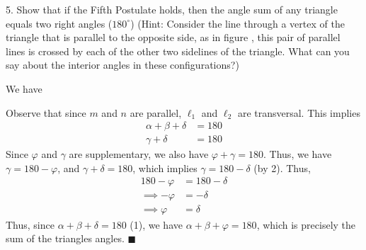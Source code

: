 \documentclass{report}
\begin{document}
    \pagebreak \bigbreak \noindent 
    \begin{mdframed}
        5. Show that if the Fifth Postulate holds, then the angle sum of any triangle equals two right angles ($180^{\circ}$) (Hint: Consider the line through a vertex of the triangle that is parallel to the opposite side, as in figure \thefigtitle, this pair of parallel lines is crossed by each of the other two sidelines of the triangle. What can you say about the interior angles in these configurations?)
    \end{mdframed}
    \bigbreak \noindent 
    \begin{figure}[ht]
        \centering
        \label{fig:fig5}
    \end{figure}
    \fc{}
    \bigbreak \noindent 
    We have
    \bigbreak \noindent 
\begin{figure}[ht]
    \centering
    \label{fig:lmane1}
\end{figure}
\bigbreak \noindent 
    Observe that since $m$ and $n$ are parallel, $\ell_{1}$ and $\ell_{2}$ are transversal. This implies
    \begin{align*}
        \alpha + \beta + \delta &= 180          \tag{1}\\
        \gamma + \delta &= 180 \tag{2}
    \end{align*}
    Since $\varphi$ and $\gamma$ are supplementary, we also have $\varphi + \gamma =180$. Thus, we have $ \gamma = 180 -\varphi $, and $\gamma +\delta = 180 $, which implies $\gamma = 180 - \delta $ (by 2). Thus,
    \begin{align*}
        180 - \varphi &=      180 - \delta \\
        \implies -\varphi &= -\delta \\
        \implies \varphi &= \delta
    \end{align*}
    Thus, since $\alpha + \beta + \delta = 180$ (1), we have $\alpha + \beta + \varphi =180$, which is precisely the sum of the triangles angles. \hspace*{\fill} $\blacksquare$
\end{document}
